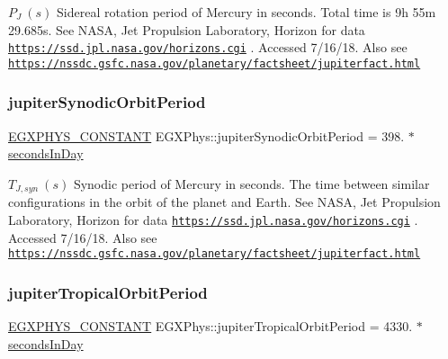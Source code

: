 $ P_{J} \ (s)$ Sidereal rotation period of Mercury in seconds. Total time is 9h 55m 29.\+685s. See N\+A\+SA, Jet Propulsion Laboratory, Horizon for data \href{https://ssd.jpl.nasa.gov/horizons.cgi}{\tt https\+://ssd.\+jpl.\+nasa.\+gov/horizons.\+cgi} . Accessed 7/16/18. Also see \href{https://nssdc.gsfc.nasa.gov/planetary/factsheet/jupiterfact.html}{\tt https\+://nssdc.\+gsfc.\+nasa.\+gov/planetary/factsheet/jupiterfact.\+html} \mbox{\label{group___e_g_x_phys-_constants-_astrophysics-_solar_system-_jupiter-_orbit_gaa7c9f21fa2b8062166764a6f59d0bbeb}} 
\subsubsection{\texorpdfstring{jupiter\+Synodic\+Orbit\+Period}{jupiterSynodicOrbitPeriod}}
{\footnotesize\ttfamily \mbox{\hyperlink{group___e_g_x_phys-_constants-_macros_ga76980d288494ce1714c9ac68a95ba702}{E\+G\+X\+P\+H\+Y\+S\+\_\+\+C\+O\+N\+S\+T\+A\+NT}} E\+G\+X\+Phys\+::jupiter\+Synodic\+Orbit\+Period = 398. $\ast$ \mbox{\hyperlink{namespace_e_g_x_phys_a93d2a00d75411b58cbf63ab3fd1f8bc2}{seconds\+In\+Day}}}

$ T_{J,syn} \ (s)$ Synodic period of Mercury in seconds. The time between similar configurations in the orbit of the planet and Earth. See N\+A\+SA, Jet Propulsion Laboratory, Horizon for data \href{https://ssd.jpl.nasa.gov/horizons.cgi}{\tt https\+://ssd.\+jpl.\+nasa.\+gov/horizons.\+cgi} . Accessed 7/16/18. Also see \href{https://nssdc.gsfc.nasa.gov/planetary/factsheet/jupiterfact.html}{\tt https\+://nssdc.\+gsfc.\+nasa.\+gov/planetary/factsheet/jupiterfact.\+html} \mbox{\label{group___e_g_x_phys-_constants-_astrophysics-_solar_system-_jupiter-_orbit_gadfa22f4534517958f4a3d8b13b83eb6f}} 
\subsubsection{\texorpdfstring{jupiter\+Tropical\+Orbit\+Period}{jupiterTropicalOrbitPeriod}}
{\footnotesize\ttfamily \mbox{\hyperlink{group___e_g_x_phys-_constants-_macros_ga76980d288494ce1714c9ac68a95ba702}{E\+G\+X\+P\+H\+Y\+S\+\_\+\+C\+O\+N\+S\+T\+A\+NT}} E\+G\+X\+Phys\+::jupiter\+Tropical\+Orbit\+Period = 4330. $\ast$ \mbox{\hyperlink{namespace_e_g_x_phys_a93d2a00d75411b58cbf63ab3fd1f8bc2}{seconds\+In\+Day}}}

